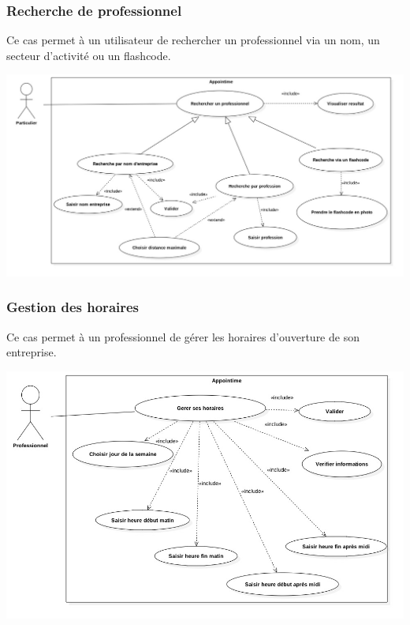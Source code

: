 \documentclass{article}
\begin{document}
\subsubsection{Recherche de professionnel}
Ce cas permet à un utilisateur de rechercher un professionnel via un nom, un secteur d'activité ou un flashcode.
\begin{center}
  \includegraphics[width=400pt]{diagram/useCaseRecherchePro}
\end{center}

\subsubsection{Gestion des horaires}
Ce cas permet à un professionnel de gérer les horaires d'ouverture de son entreprise.
\begin{center}
  \includegraphics[width=400pt]{diagram/useCaseGererHoraire}
\end{center}
\end{document}
